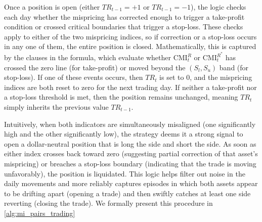 Once a position is open (either \(TR_{t-1} = +1\) or \(TR_{t-1} = -1\)), the logic checks each day whether the mispricing has corrected enough to trigger a take-profit condition or crossed critical boundaries that trigger a stop-loss. These checks apply to either of the two mispricing indices, so if correction or a stop-loss occurs in any one of them, the entire position is closed. Mathematically, this is captured by the  clauses in the formula, which evaluate whether \(\mathrm{CMI}_t^R\) or \(\mathrm{CMI}_t^{R^*}\) has crossed the zero line (for take-profit) or moved beyond the \((S_l, S_u)\) band (for stop-loss). If one of these events occurs, then \(TR_t\) is set to \(0\), and the mispricing indices are both reset to zero for the next trading day. 
If neither a take-profit nor a stop-loss threshold is met, then the position remains unchanged, meaning \(TR_t\) simply inherits the previous value \(TR_{t-1}\).

Intuitively, when both indicators are simultaneously misaligned (one significantly high and the other significantly low), the strategy deems it a strong signal to open a dollar-neutral position that is long the  side and short the  side. As soon as either index crosses back toward zero (suggesting partial correction of that asset's mispricing) or breaches a stop-loss boundary (indicating that the trade is moving unfavorably), the position is liquidated. This  logic helps filter out noise in the daily movements and more reliably captures episodes in which both assets appear to be drifting apart (opening a trade) and then swiftly catches at least one side reverting (closing the trade). 
%
We formally present this procedure in \cref{alg:mi_pairs_trading}

